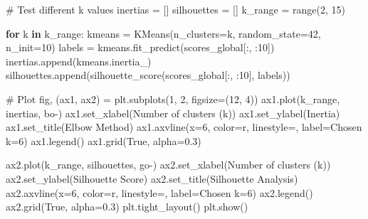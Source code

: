 \documentclass[
  letterpaper,
  DIV=11,
  numbers=noendperiod]{scrartcl}
\newenvironment{Shaded}{\begin{snugshade}}{\end{snugshade}}
\newcommand{\BuiltInTok}[1]{\textcolor[rgb]{0.00,0.23,0.31}{#1}}
\newcommand{\CommentTok}[1]{\textcolor[rgb]{0.37,0.37,0.37}{#1}}
\newcommand{\ControlFlowTok}[1]{\textcolor[rgb]{0.00,0.23,0.31}{\textbf{#1}}}
\newcommand{\DecValTok}[1]{\textcolor[rgb]{0.68,0.00,0.00}{#1}}
\newcommand{\FloatTok}[1]{\textcolor[rgb]{0.68,0.00,0.00}{#1}}
\newcommand{\KeywordTok}[1]{\textcolor[rgb]{0.00,0.23,0.31}{\textbf{#1}}}
\newcommand{\NormalTok}[1]{\textcolor[rgb]{0.00,0.23,0.31}{#1}}
\newcommand{\OperatorTok}[1]{\textcolor[rgb]{0.37,0.37,0.37}{#1}}
\newcommand{\StringTok}[1]{\textcolor[rgb]{0.13,0.47,0.30}{#1}}
\newcommand{\VariableTok}[1]{\textcolor[rgb]{0.07,0.07,0.07}{#1}}
\renewenvironment{Shaded}{%
  \begin{tcolorbox}[%
    enhanced,%
    colback=codebg,%
    colframe=codebg,%
    borderline west={3pt}{0pt}{sectionblue},%
    fontupper=\small\ttfamily,%
    boxrule=0pt,%
    arc=0pt,%
    boxsep=5pt,%
    left=2mm,%
    right=2mm,%
    top=2mm,%
    bottom=2mm%
  ]%
}{%
  \end{tcolorbox}%
}
\begin{document}
\begin{Shaded}
\begin{Highlighting}[]
\CommentTok{\# Test different k values}
\NormalTok{inertias }\OperatorTok{=}\NormalTok{ []}
\NormalTok{silhouettes }\OperatorTok{=}\NormalTok{ []}
\NormalTok{k\_range }\OperatorTok{=} \BuiltInTok{range}\NormalTok{(}\DecValTok{2}\NormalTok{, }\DecValTok{15}\NormalTok{)}

\ControlFlowTok{for}\NormalTok{ k }\KeywordTok{in}\NormalTok{ k\_range:}
\NormalTok{    kmeans }\OperatorTok{=}\NormalTok{ KMeans(n\_clusters}\OperatorTok{=}\NormalTok{k, random\_state}\OperatorTok{=}\DecValTok{42}\NormalTok{, n\_init}\OperatorTok{=}\DecValTok{10}\NormalTok{)}
\NormalTok{    labels }\OperatorTok{=}\NormalTok{ kmeans.fit\_predict(scores\_global[:, :}\DecValTok{10}\NormalTok{])}
\NormalTok{    inertias.append(kmeans.inertia\_)}
\NormalTok{    silhouettes.append(silhouette\_score(scores\_global[:, :}\DecValTok{10}\NormalTok{], labels))}

\CommentTok{\# Plot}
\NormalTok{fig, (ax1, ax2) }\OperatorTok{=}\NormalTok{ plt.subplots(}\DecValTok{1}\NormalTok{, }\DecValTok{2}\NormalTok{, figsize}\OperatorTok{=}\NormalTok{(}\DecValTok{12}\NormalTok{, }\DecValTok{4}\NormalTok{))}
\NormalTok{ax1.plot(k\_range, inertias, }\StringTok{\textquotesingle{}bo{-}\textquotesingle{}}\NormalTok{)}
\NormalTok{ax1.set\_xlabel(}\StringTok{\textquotesingle{}Number of clusters (k)\textquotesingle{}}\NormalTok{)}
\NormalTok{ax1.set\_ylabel(}\StringTok{\textquotesingle{}Inertia\textquotesingle{}}\NormalTok{)}
\NormalTok{ax1.set\_title(}\StringTok{\textquotesingle{}Elbow Method\textquotesingle{}}\NormalTok{)}
\NormalTok{ax1.axvline(x}\OperatorTok{=}\DecValTok{6}\NormalTok{, color}\OperatorTok{=}\StringTok{\textquotesingle{}r\textquotesingle{}}\NormalTok{, linestyle}\OperatorTok{=}\StringTok{\textquotesingle{}{-}{-}\textquotesingle{}}\NormalTok{, label}\OperatorTok{=}\StringTok{\textquotesingle{}Chosen k=6\textquotesingle{}}\NormalTok{)}
\NormalTok{ax1.legend()}
\NormalTok{ax1.grid(}\VariableTok{True}\NormalTok{, alpha}\OperatorTok{=}\FloatTok{0.3}\NormalTok{)}

\NormalTok{ax2.plot(k\_range, silhouettes, }\StringTok{\textquotesingle{}go{-}\textquotesingle{}}\NormalTok{)}
\NormalTok{ax2.set\_xlabel(}\StringTok{\textquotesingle{}Number of clusters (k)\textquotesingle{}}\NormalTok{)}
\NormalTok{ax2.set\_ylabel(}\StringTok{\textquotesingle{}Silhouette Score\textquotesingle{}}\NormalTok{)}
\NormalTok{ax2.set\_title(}\StringTok{\textquotesingle{}Silhouette Analysis\textquotesingle{}}\NormalTok{)}
\NormalTok{ax2.axvline(x}\OperatorTok{=}\DecValTok{6}\NormalTok{, color}\OperatorTok{=}\StringTok{\textquotesingle{}r\textquotesingle{}}\NormalTok{, linestyle}\OperatorTok{=}\StringTok{\textquotesingle{}{-}{-}\textquotesingle{}}\NormalTok{, label}\OperatorTok{=}\StringTok{\textquotesingle{}Chosen k=6\textquotesingle{}}\NormalTok{)}
\NormalTok{ax2.legend()}
\NormalTok{ax2.grid(}\VariableTok{True}\NormalTok{, alpha}\OperatorTok{=}\FloatTok{0.3}\NormalTok{)}
\NormalTok{plt.tight\_layout()}
\NormalTok{plt.show()}
\end{Highlighting}
\end{Shaded}
\end{document}
